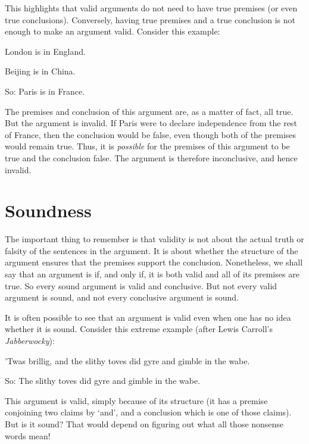This highlights that valid arguments do not need to have true premises (or even true conclusions). Conversely, having true premises and a true conclusion is not enough to make an argument valid. Consider this example:
	\begin{earg}
		\item[] London is in England.
		\item[] Beijing is in China.
		\item[So:] Paris is in France.
	\end{earg}
The premises and conclusion of this argument are, as a matter of fact, all true. But the argument is invalid. If Paris were to declare independence from the rest of France, then the conclusion would be false, even though both of the premises would remain true. Thus, it is \emph{possible} for the premises of this argument to be true and the conclusion false. The argument is therefore inconclusive, and hence invalid.

\section{Soundness}

The important thing to remember is that validity is not about the actual truth or falsity of the sentences in the argument. It is about whether the structure of the argument ensures that the premises support the conclusion. Nonetheless, we shall say that an argument is  if, and only if, it is both valid and all of its premises are true. So every sound argument is valid and conclusive. But not every valid argument is sound, and not every conclusive argument is sound.

It is often possible to see that an argument is valid even when one has no idea whether it is sound. Consider this extreme example (after Lewis Carroll's \emph{Jabberwocky}):
\begin{earg}
	\item[] ’Twas brillig, \textsf{and} the slithy toves did gyre and gimble in the wabe.
	\item[So:] The slithy toves did gyre and gimble in the wabe.
\end{earg} This argument is valid, simply because of its structure (it has a premise conjoining two claims by `and', and a conclusion which is one of those claims). But is it sound? That would depend on figuring out what all those nonsense words mean!

